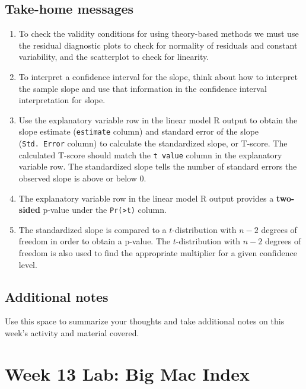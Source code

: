 \documentclass[
]{report}
\begin{document}
\hypertarget{take-home-messages-21}{%
\subsection{Take-home messages}\label{take-home-messages-21}}

\begin{enumerate}
\def\labelenumi{\arabic{enumi}.}
\item
  To check the validity conditions for using theory-based methods we must use the residual diagnostic plots to check for normality of residuals and constant variability, and the scatterplot to check for linearity.
\item
  To interpret a confidence interval for the slope, think about how to interpret the sample slope and use that information in the confidence interval interpretation for slope.
\item
  Use the explanatory variable row in the linear model R output to obtain the slope estimate (\texttt{estimate} column) and standard error of the slope (\texttt{Std.\ Error} column) to calculate the standardized slope, or T-score. The calculated T-score should match the \texttt{t\ value} column in the explanatory variable row. The standardized slope tells the number of standard errors the observed slope is above or below 0.
\item
  The explanatory variable row in the linear model R output provides a \textbf{two-sided} p-value under the \texttt{Pr(\textgreater{}\textbar{}t\textbar{})} column.
\item
  The standardized slope is compared to a \(t\)-distribution with \(n-2\) degrees of freedom in order to obtain a p-value. The \(t\)-distribution with \(n-2\) degrees of freedom is also used to find the appropriate multiplier for a given confidence level.
\end{enumerate}

\hypertarget{additional-notes-20}{%
\subsection{Additional notes}\label{additional-notes-20}}

Use this space to summarize your thoughts and take additional notes on this week's activity and material covered.

\newpage

\hypertarget{week-13-lab-big-mac-index}{%
\section{Week 13 Lab: Big Mac Index}\label{week-13-lab-big-mac-index}}
\end{document}

